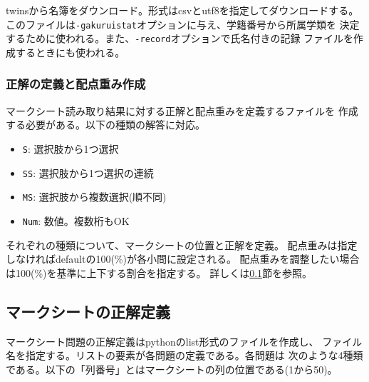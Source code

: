 twinsから名簿をダウンロード。形式はcsvとutf8を指定してダウンロードする。
このファイルは\texttt{-gakuruistat}オプションに与え、学籍番号から所属学類を
決定するために使われる。また、\texttt{-record}オプションで氏名付きの記録
ファイルを作成するときにも使われる。

\subsubsection{正解の定義と配点重み作成}
\label{正解の定義と配点重み作成}

マークシート読み取り結果に対する正解と配点重みを定義するファイルを
作成する必要がある。以下の種類の解答に対応。

\begin{itemize}
\item \texttt{S}: 選択肢から1つ選択

\item \texttt{SS}: 選択肢から1つ選択の連続

\item \texttt{MS}: 選択肢から複数選択(順不同)

\item \texttt{Num}: 数値。複数桁もOK

\end{itemize}
それぞれの種類について、マークシートの位置と正解を定義。
配点重みは指定しなければdefaultの100(\%)が各小問に設定される。
配点重みを調整したい場合は100(\%)を基準に上下する割合を指定する。
詳しくは\ref{mksheet-ref}節を参照。

\subsection{マークシートの正解定義}
\label{mksheet-ref}

マークシート問題の正解定義はpythonのlist形式のファイルを作成し、
ファイル名を指定する。リストの要素が各問題の定義である。各問題は
次のような4種類である。以下の「列番号」とはマークシートの列の位置である(1から50)。

